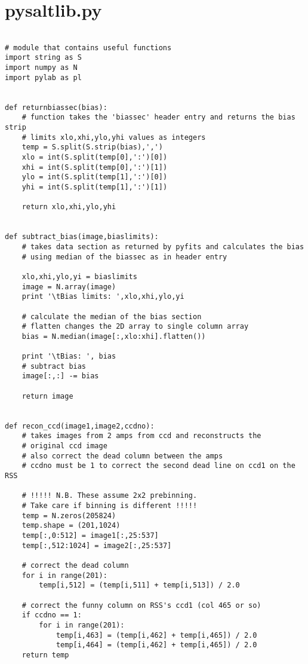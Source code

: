 \section{pysaltlib.py}
\label{pysaltlib}


\begin{footnotesize}
\begin{verbatim}
 
# module that contains useful functions
import string as S
import numpy as N
import pylab as pl


def returnbiassec(bias):
    # function takes the 'biassec' header entry and returns the bias strip 
    # limits xlo,xhi,ylo,yhi values as integers
    temp = S.split(S.strip(bias),',')
    xlo = int(S.split(temp[0],':')[0])
    xhi = int(S.split(temp[0],':')[1])
    ylo = int(S.split(temp[1],':')[0])
    yhi = int(S.split(temp[1],':')[1])
    
    return xlo,xhi,ylo,yhi
    

def subtract_bias(image,biaslimits):
    # takes data section as returned by pyfits and calculates the bias 
    # using median of the biassec as in header entry
    
    xlo,xhi,ylo,yi = biaslimits
    image = N.array(image)
    print '\tBias limits: ',xlo,xhi,ylo,yi
    
    # calculate the median of the bias section
    # flatten changes the 2D array to single column array
    bias = N.median(image[:,xlo:xhi].flatten())
    
    print '\tBias: ', bias
    # subtract bias
    image[:,:] -= bias
    
    return image


def recon_ccd(image1,image2,ccdno):
    # takes images from 2 amps from ccd and reconstructs the
    # original ccd image
    # also correct the dead column between the amps
    # ccdno must be 1 to correct the second dead line on ccd1 on the RSS

    # !!!!! N.B. These assume 2x2 prebinning.
    # Take care if binning is different !!!!!
    temp = N.zeros(205824)
    temp.shape = (201,1024)
    temp[:,0:512] = image1[:,25:537]
    temp[:,512:1024] = image2[:,25:537]

    # correct the dead column
    for i in range(201):
        temp[i,512] = (temp[i,511] + temp[i,513]) / 2.0

    # correct the funny column on RSS's ccd1 (col 465 or so)
    if ccdno == 1:
        for i in range(201):
            temp[i,463] = (temp[i,462] + temp[i,465]) / 2.0
            temp[i,464] = (temp[i,462] + temp[i,465]) / 2.0
    return temp



\end{verbatim}
\end{footnotesize}
